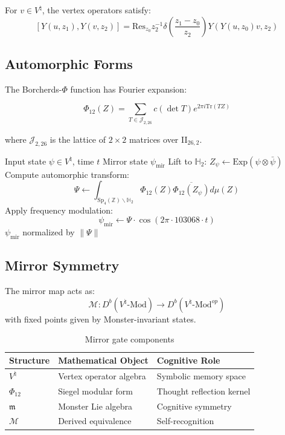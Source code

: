 \documentclass[12pt]{article}
\begin{document}
\begin{theorem}
For $v\in V^\natural$, the vertex operators satisfy:
\[
[Y(u,z_1),Y(v,z_2)] = \mathrm{Res}_{z_0} z_2^{-1}\delta\left(\frac{z_1-z_0}{z_2}\right)Y(Y(u,z_0)v,z_2)
\]
\end{theorem}

\subsection{Automorphic Forms}
The Borcherds-$\Phi$ function has Fourier expansion:

\begin{equation}
\Phi_{12}(Z) = \sum_{T\in\mathcal{J}_{2,26}} c(\det T)e^{2\pi i\mathrm{Tr}(TZ)}
\end{equation}

where $\mathcal{J}_{2,26}$ is the lattice of $2\times 2$ matrices over II$_{26,2}$.

\begin{algorithm}[H]
\caption{Borcherds Phi Activation}
\begin{algorithmic}[1]
\Require Input state $\psi\in V^\natural$, time $t$
\Ensure Mirror state $\psi_{\text{mir}}$
\State Lift to $\mathbb{H}_2$: $Z_\psi \gets \mathrm{Exp}(\psi\otimes\bar{\psi})$
\State Compute automorphic transform:
\[
\Psi \gets \int_{\mathrm{Sp}_4(\mathbb{Z})\backslash\mathbb{H}_2} \Phi_{12}(Z)\overline{\Phi_{12}(Z_\psi)}d\mu(Z)
\]
\State Apply frequency modulation:
\[
\psi_{\text{mir}} \gets \Psi\cdot\cos(2\pi\cdot 103068\cdot t)
\]
\State \Return $\psi_{\text{mir}}$ normalized by $\|\Psi\|$
\end{algorithmic}
\end{algorithm}

\subsection{Mirror Symmetry}
\begin{definition}
The mirror map acts as:
\[
\mathcal{M}\colon D^b(V^\natural\text{-Mod}) \to D^b(V^\natural\text{-Mod}^{op})
\]
with fixed points given by Monster-invariant states.
\end{definition}

\begin{table}[h]
\centering
\begin{tabular}{lll}
\toprule
\textbf{Structure} & \textbf{Mathematical Object} & \textbf{Cognitive Role} \\
\midrule
$V^\natural$ & Vertex operator algebra & Symbolic memory space \\
$\Phi_{12}$ & Siegel modular form & Thought reflection kernel \\
$\mathfrak{m}$ & Monster Lie algebra & Cognitive symmetry \\
$\mathcal{M}$ & Derived equivalence & Self-recognition \\
\bottomrule
\end{tabular}
\caption{Mirror gate components}
\end{table}
\end{document}

